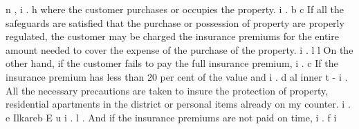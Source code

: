 \documentclass{article}%
\begin{document}
n\newline%
, i\newline%
.\newline%
h\newline%
where the customer purchases or occupies the property. i\newline%
.\newline%
b\newline%
c\newline%
If all the safeguards are satisfied that the purchase or possession of property are properly regulated, the customer may be charged the insurance premiums for the entire amount needed to cover the expense of the purchase of the property. i\newline%
.\newline%
l\newline%
l\newline%
On the other hand, if the customer fails to pay the full insurance premium, i\newline%
.\newline%
c\newline%
If the insurance premium has less than 20 per cent of the value and i\newline%
.\newline%
d\newline%
al\newline%
inner\newline%
t\newline%
{-} i\newline%
.\newline%
All the necessary precautions are taken to insure the protection of property, residential apartments in the district or personal items already on my counter. i\newline%
.\newline%
e\newline%
Ilkareb\newline%
E\newline%
\newline%
u\newline%
i\newline%
.\newline%
l\newline%
.\newline%
And if the insurance premiums are not paid on time, i\newline%
.\newline%
f\newline%
i\newline%
\end{document}
